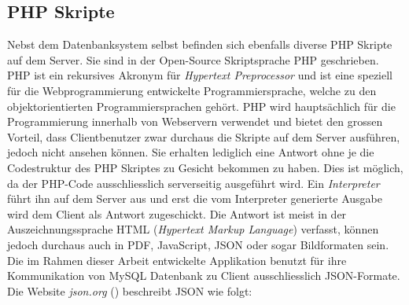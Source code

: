 \documentclass[a4paper,11pt]{report}
\begin{document}
				
				\subsection{PHP Skripte} \label{ssec:PHP}
				Nebst dem Datenbanksystem selbst befinden sich ebenfalls diverse PHP Skripte auf dem Server. Sie sind in der Open-Source Skriptsprache PHP geschrieben. PHP ist ein rekursives Akronym für \emph{Hypertext Preprocessor} und ist eine speziell für die Webprogrammierung entwickelte Programmiersprache, welche zu den objektorientierten Programmiersprachen gehört. PHP wird hauptsächlich für die Programmierung innerhalb von Webservern verwendet und bietet den grossen Vorteil, dass Clientbenutzer zwar durchaus die Skripte auf dem Server ausführen, jedoch nicht ansehen können. Sie erhalten lediglich eine Antwort ohne je die Codestruktur des PHP Skriptes zu Gesicht bekommen zu haben.\cite{PHP} Dies ist möglich, da der PHP-Code ausschliesslich serverseitig ausgeführt wird. Ein \emph{Interpreter} führt ihn auf dem Server aus und erst die vom Interpreter generierte Ausgabe wird dem Client als Antwort zugeschickt. Die Antwort ist meist in der Auszeichnungssprache HTML (\emph{Hypertext Markup Language}) verfasst, können jedoch durchaus auch in PDF, JavaScript, JSON oder sogar Bildformaten sein.\cite{PHP:function} Die im Rahmen dieser Arbeit entwickelte Applikation benutzt für ihre Kommunikation von MySQL Datenbank zu Client ausschliesslich JSON-Formate. Die Website \emph{json.org} (\cite{JSON}) beschreibt JSON wie folgt:
				
\end{document}
